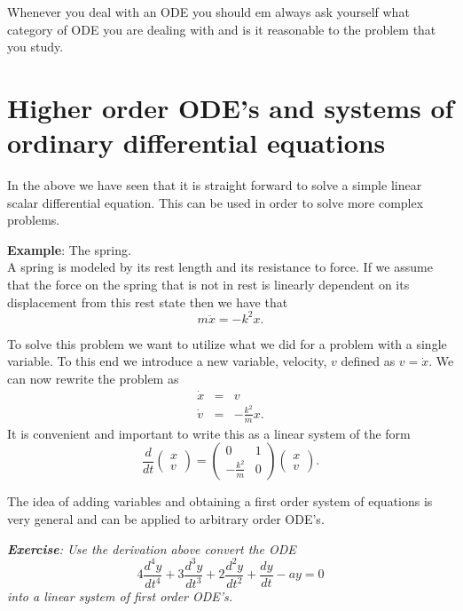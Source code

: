 \documentclass[12pt,legal]{article}
\begin{document}
Whenever you deal with an ODE you should {em always}  ask yourself what category of ODE you are dealing with and is it reasonable to the problem that you study.


\section{Higher order ODE's and systems of ordinary differential equations}

In the above we have seen that it is straight forward to solve a simple linear  scalar differential equation. This can be used in order to solve more complex problems.

\bigskip

{\em{{\bf {Example}}: The spring. \\
A spring is modeled by its rest length  and its resistance to force.
If we assume that the force on the spring that is not in rest is linearly dependent on its displacement from this rest state then we have that
$$ m \ddot{x} = -k^2 x. $$


To solve this problem we want to utilize what we did for a problem with a single variable. To this end we introduce a new variable, velocity, $v$ defined as
$v=\dot{x}$.
We can now rewrite the problem as
\begin{eqnarray*}
\dot{x} &=& v \\
\dot{v} &=& -{\frac {k^2}{m}} x.
\end{eqnarray*}
It is convenient and important to write this as a linear system of the form
$$ {\frac d{dt}} \begin{pmatrix} x \\ v \end{pmatrix}
= \begin{pmatrix} 0  &  1 \\  -{\frac {k^2}{m}} & 0 
\end{pmatrix}\begin{pmatrix} x \\ v \end{pmatrix}. $$}}

\bigskip

The idea of adding variables and obtaining a first order system of equations
is very general and can be applied to arbitrary order ODE's.

{\em{{\bf{Exercise}}: Use the derivation above convert the ODE
$$ 4{\frac {d^4y}{dt^4}} + 3{\frac {d^3y}{dt^3}} + 2{\frac {d^2y}{dt^2}}  +
{\frac {dy}{dt}} - a y = 0$$
into a linear system of first order ODE's. }}
\end{document}
